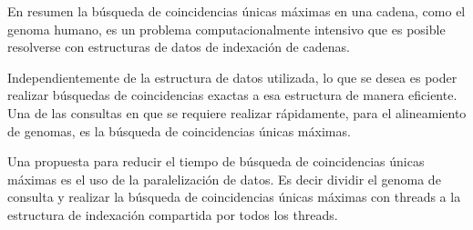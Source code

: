 \documentclass[12pt,a4paper]{article}
\begin{document}
\indent
En resumen la búsqueda de coincidencias únicas máximas en una cadena, como el 
genoma humano, es un problema computacionalmente intensivo que es posible 
resolverse con estructuras de datos de indexación de cadenas. 

\indent
Independientemente de la estructura de datos utilizada, lo que se desea es poder realizar búsquedas de coincidencias exactas a esa estructura de manera eficiente. 
Una de las consultas en que se requiere realizar rápidamente, para el alineamiento de genomas, es la búsqueda de coincidencias únicas máximas. 

Una propuesta para reducir el tiempo de b\'usqueda de coincidencias \'unicas m\'aximas es el uso de la paralelizaci\'on de datos. Es decir dividir el genoma de consulta y realizar la b\'usqueda de coincidencias \'unicas m\'aximas con threads a la estructura de indexaci\'on compartida por todos los threads.
\end{document}
